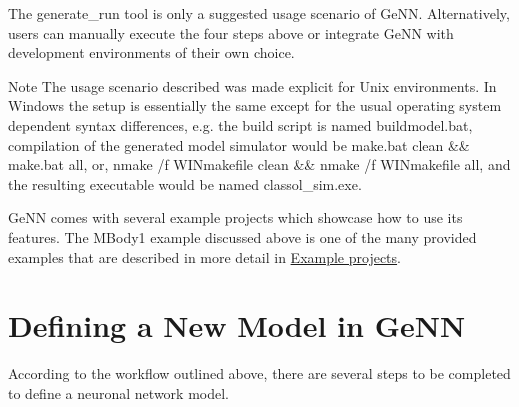 The {\ttfamily generate\+\_\+run} tool is only a suggested usage scenario of Ge\+N\+N. Alternatively, users can manually execute the four steps above or integrate Ge\+N\+N with development environments of their own choice.

\begin{DoxyNote}{Note}
The usage scenario described was made explicit for Unix environments. In Windows the setup is essentially the same except for the usual operating system dependent syntax differences, e.\+g. the build script is named buildmodel.\+bat, compilation of the generated model simulator would be {\ttfamily make.\+bat clean \&\& make.\+bat all}, or, {\ttfamily nmake /f W\+I\+Nmakefile clean \&\& nmake /f W\+I\+Nmakefile all}, and the resulting executable would be named {\ttfamily classol\+\_\+sim.\+exe}.
\end{DoxyNote}
Ge\+N\+N comes with several example projects which showcase how to use its features. The M\+Body1 example discussed above is one of the many provided examples that are described in more detail in \hyperlink{}{Example projects}.\hypertarget{Quickstart_sec_ownmodel}{}\section{Defining a New Model in Ge\+N\+N}\label{Quickstart_sec_ownmodel}
According to the workflow outlined above, there are several steps to be completed to define a neuronal network model.


